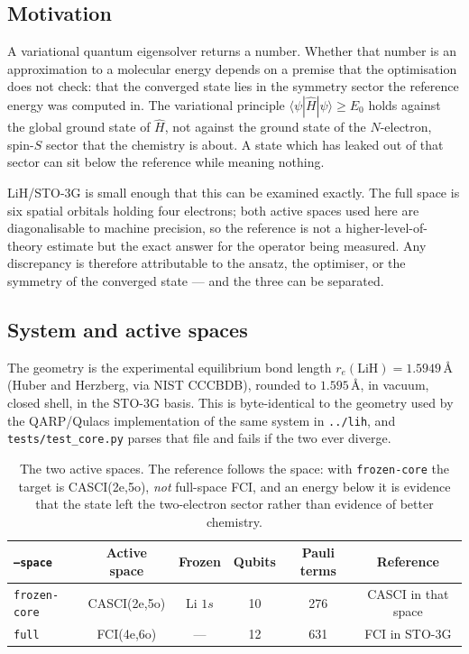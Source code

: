 \documentclass[11pt,a4paper]{article}
\newcommand{\Ang}{\ensuremath{\,\text{\AA}}}
\newcommand{\code}[1]{\texttt{\small #1}}
\begin{document}
\subsection{Motivation}

A variational quantum eigensolver returns a number. Whether that number is an
approximation to a molecular energy depends on a premise that the optimisation
does not check: that the converged state lies in the symmetry sector the
reference energy was computed in. The variational principle
$\langle \psi | \hat H | \psi \rangle \geq E_0$ holds against the global ground
state of $\hat H$, not against the ground state of the $N$-electron, spin-$S$
sector that the chemistry is about. A state which has leaked out of that sector
can sit below the reference while meaning nothing.

LiH/STO-3G is small enough that this can be examined exactly. The full space is
six spatial orbitals holding four electrons; both active spaces used here are
diagonalisable to machine precision, so the reference is not a
higher-level-of-theory estimate but the exact answer for the operator being
measured. Any discrepancy is therefore attributable to the ansatz, the
optimiser, or the symmetry of the converged state --- and the three can be
separated.

\subsection{System and active spaces}

The geometry is the experimental equilibrium bond length
$r_e(\mathrm{LiH}) = 1.5949\Ang$ (Huber and Herzberg, via NIST CCCBDB), rounded
to $1.595\Ang$, in vacuum, closed shell, in the STO-3G basis. This is
byte-identical to the geometry used by the QARP/Qulacs implementation of the
same system in \code{../lih}, and \code{tests/test\_core.py} parses that file and
fails if the two ever diverge.

\begin{table}[htbp]
\centering
\caption{The two active spaces. The reference follows the space: with
\code{frozen-core} the target is CASCI(2e,5o), \emph{not} full-space FCI, and an
energy below it is evidence that the state left the two-electron sector rather
than evidence of better chemistry.}
\label{tab:spaces}
\small
\begin{tabular}{lccccc}
\toprule
\code{--space} & Active space & Frozen & Qubits & Pauli terms & Reference \\
\midrule
\code{frozen-core} & CASCI(2e,5o) & Li $1s$ & 10 & 276 & CASCI in that space \\
\code{full}        & FCI(4e,6o)   & ---      & 12 & 631 & FCI in STO-3G \\
\bottomrule
\end{tabular}
\end{table}
\end{document}
